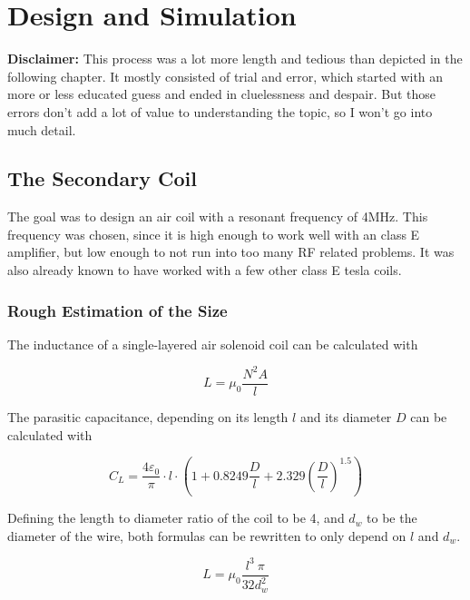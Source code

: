 
\chapter{Design and Simulation} %

\textbf{Disclaimer:} This process was a lot more length and tedious than depicted in the following chapter. It mostly consisted of trial and error, which started with an more or less educated guess and ended in cluelessness and despair. But those errors don't add a lot of value to understanding the topic, so I won't go into much detail.

\section{The Secondary Coil}

The goal was to design an air coil with a resonant frequency of 4MHz. This frequency was chosen, since it is high enough to work well with an class E amplifier, but low enough to not run into too many RF related problems. It was also already known to have worked with a few other class E tesla coils.

\subsection{Rough Estimation of the Size}

The inductance of a single-layered air solenoid coil can be calculated with

\begin{equation}\label{eq-inductivity}
    L = \mu_0 \frac{N^2 A}{l}
\end{equation}

The parasitic capacitance, depending on its length \(l\) and its diameter \(D\) can be calculated with

\begin{equation}\label{eq-parasitic-capacitance}
    C_L = \frac{4\varepsilon_0}{\pi} \cdot l \cdot \left( 1 + 0.8249 \frac{D}{l} + 2.329 \left(\frac{D}{l}\right)^{1.5}\right)
\end{equation}

Defining the length to diameter ratio of the coil to be 4, and \(d_w\) to be the diameter of the wire, both formulas can be rewritten to only depend on \(l\) and \(d_w\). 

\begin{equation}
    L = \mu_0 \frac{l^3\ \pi}{32 d_w^2}
\end{equation}


